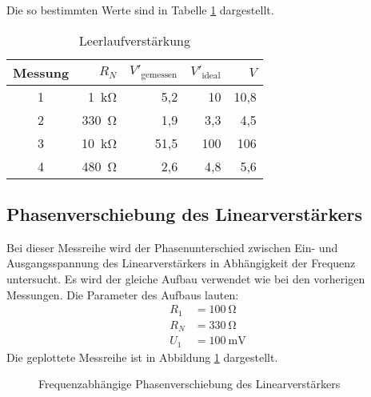 Die so bestimmten Werte sind in Tabelle \ref{tab:leerlauf} dargestellt.
\begin{table}
	\centering
	\begin{tabular}{c r r r r}
		\toprule
		Messung & $R_N$ & $V'_\text{gemessen}$ & $V'_\text{ideal}$ & $V$ \\
		\midrule
		1 & \SI{1}{\kilo \ohm} & 5,2 & 10 & 10,8 \\
		2 & \SI{330}{\ohm} & 1,9 & 3,3 & 4,5 \\
		3 & \SI{10}{\kilo \ohm} & 51,5 & 100 & 106 \\
		4 & \SI{480}{\ohm} & 2,6 & 4,8 & 5,6 \\
		\bottomrule
	\end{tabular}
	\caption{Leerlaufverstärkung}
	\label{tab:leerlauf}
\end{table}

\subsection{Phasenverschiebung des Linearverstärkers}
Bei dieser Messreihe wird der Phasenunterschied zwischen Ein- und Ausgangsspannung des Linearverstärkers in Abhängigkeit der Frequenz untersucht.
Es wird der gleiche Aufbau verwendet wie bei den vorherigen Messungen.
Die Parameter des Aufbaus lauten:
\begin{align}
	R_1 &= \SI{100}{\ohm} \\
	R_N &= \SI{330}{\ohm} \\
	U_1 &= \SI{100}{\milli \volt}
\end{align}
Die geplottete Messreihe ist in Abbildung \ref{fig:phase} dargestellt.

\begin{figure}
	\centering
	\resizebox{\pltwidth}{!}{
		
	}
	\caption{Frequenzabhängige Phasenverschiebung des Linearverstärkers}
	\label{fig:phase}
\end{figure}